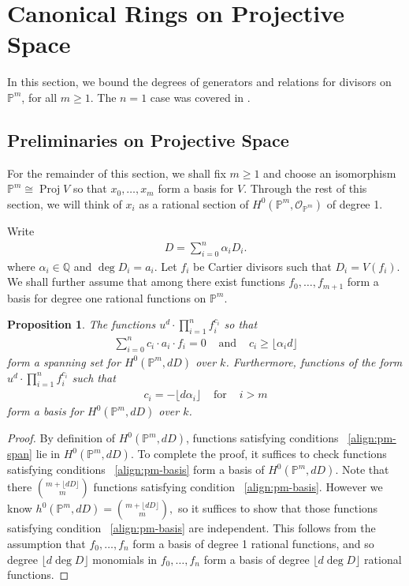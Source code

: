 \documentclass{amsart}
\theoremstyle{plain}
\newtheorem{prop}[thm]{Proposition}
\theoremstyle{definition}
\theoremstyle{remark}
\numberwithin{equation}{section}
\newcommand\ssec{\subsection}
\newcommand\bq{{\mathbb Q}}
\newcommand\bp{{\mathbb P}}
\newcommand\sco{{\mathscr O}}
\DeclareMathOperator{\proj}{Proj}
\begin{document}
\section{Canonical Rings on Projective Space}
In this section, we bound the degrees of generators and relations for divisors on $\bp^m$, for all $m \geq 1$. The $n = 1$ case was covered in \cite{dorney:canonical}.

\ssec{Preliminaries on Projective Space}

For the remainder of this section, we shall fix $m \geq 1$ and choose an isomorphism $\bp^m \cong \proj V$ so that $x_0,\ldots, x_m$ form a basis for $V$. Through the rest of this section, we will think of $x_i$ as a rational section of $H^0(\bp^m, \sco_{\bp^m})$ of degree 1.


Write
\begin{align*}
	D = \sum_{i=0}^{n}\alpha_i D_i.
\end{align*}
where $\alpha_i \in \bq$ and $\deg D_i = a_i$. Let $f_i$ be Cartier divisors such that $D_i = V(f_i)$. We shall further assume that among there exist functions $f_0,\ldots, f_{m+1}$ form a basis for degree one rational functions on $\bp^m$.

\begin{prop}
\label{prop:pm-span-and-basis}
The functions $u^d \cdot \prod_{i=1}^n f_i^{c_i}$ so that 
\begin{align}
\label{align:pm-span}
\sum_{i=0}^{n} c_i \cdot a_i \cdot f_i = 0 & \text{ and } &c_i \geq \lfloor \alpha_i d\rfloor	
\end{align}
form a spanning set for $H^0(\bp^m, dD)$ over $k$. Furthermore, functions 
of the form $u^d \cdot \prod_{i=1}^n f_i^{c_i} $ such that
\begin{align}
\label{align:pm-basis}
c_i = -\lfloor d\alpha_i \rfloor & \text{ for } & i > m
\end{align}
form a basis for $H^0(\bp^m, dD)$ over $k$.
\end{prop}
\begin{proof}
By definition of $H^0(\bp^m,dD)$, functions satisfying conditions 
~\eqref{align:pm-span} lie in $H^0(\bp^m,dD)$. To complete the proof, it suffices to check functions satisfying conditions ~\eqref{align:pm-basis} form a basis of $H^0(\bp^m,dD)$. Note that there $\binom{m+ \lfloor dD \rfloor }{m}$ functions satisfying condition ~\eqref{align:pm-basis}. However we know $h^0(\bp^m,dD) = \binom{m+ \lfloor dD \rfloor }{m},$ so it suffices to show that those functions satisfying condition ~\eqref{align:pm-basis} are independent. This follows from the assumption that $f_0,\ldots, f_n$ form a basis of degree 1 rational functions, and so degree $\lfloor d \deg D \rfloor $ monomials in $f_0,\ldots, f_n$ form a basis of degree $\lfloor d \deg D \rfloor $ rational functions.
\end{proof}
\end{document}
